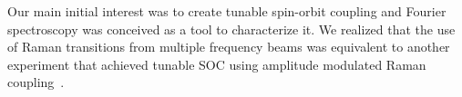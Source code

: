 Our main initial interest was to create tunable spin-orbit coupling and Fourier spectroscopy was conceived as a tool to characterize it. We realized that the use of Raman transitions from multiple frequency beams was equivalent to another experiment that achieved tunable SOC using amplitude modulated Raman coupling~\cite{jimenez-garcia_tunable_2015}.  %








